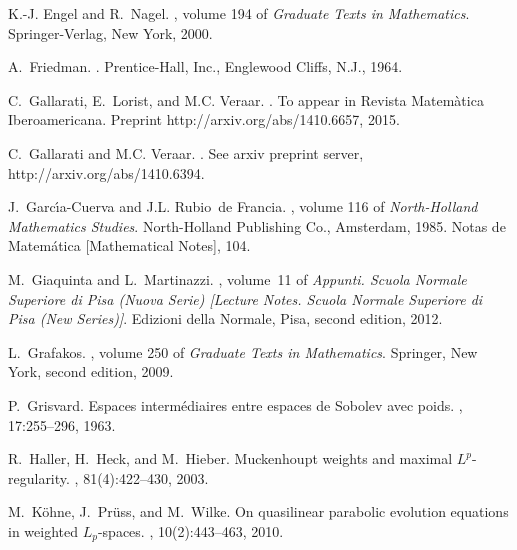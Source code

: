 \documentclass{amsart}
\theoremstyle{plain}
\theoremstyle{remark}
\theoremstyle{plain}
\numberwithin{equation}{section}
\begin{document}
\begin{thebibliography}{10}
K.-J. Engel and R.~Nagel.
, volume
  194 of {\em Graduate Texts in Mathematics}.
\newblock Springer-Verlag, New York, 2000.

A.~Friedman.
.
\newblock Prentice-Hall, Inc., Englewood Cliffs, N.J., 1964.

C.~Gallarati, E.~Lorist, and M.C. Veraar.
.
\newblock To appear in Revista Matem\`atica Iberoamericana. Preprint
  http://arxiv.org/abs/1410.6657, 2015.

C.~Gallarati and M.C. Veraar.
.
\newblock See arxiv preprint server, http://arxiv.org/abs/1410.6394.

J.~Garc{\'{\i}}a-Cuerva and J.L. Rubio~de Francia.
, volume 116 of
  {\em North-Holland Mathematics Studies}.
\newblock North-Holland Publishing Co., Amsterdam, 1985.
\newblock Notas de Matem{\'a}tica [Mathematical Notes], 104.

M.~Giaquinta and L.~Martinazzi.
, volume~11 of {\em Appunti. Scuola Normale
  Superiore di Pisa (Nuova Serie) [Lecture Notes. Scuola Normale Superiore di
  Pisa (New Series)]}.
\newblock Edizioni della Normale, Pisa, second edition, 2012.

L.~Grafakos.
, volume 250 of {\em Graduate Texts in
  Mathematics}.
\newblock Springer, New York, second edition, 2009.

P.~Grisvard.
\newblock Espaces interm\'ediaires entre espaces de {S}obolev avec poids.
, 17:255--296, 1963.

R.~Haller, H.~Heck, and M.~Hieber.
\newblock Muckenhoupt weights and maximal {$L^p$}-regularity.
, 81(4):422--430, 2003.

M.~K{\"o}hne, J.~Pr{\"u}ss, and M.~Wilke.
\newblock On quasilinear parabolic evolution equations in weighted
  {$L_p$}-spaces.
, 10(2):443--463, 2010.


\end{thebibliography}
\end{document}
